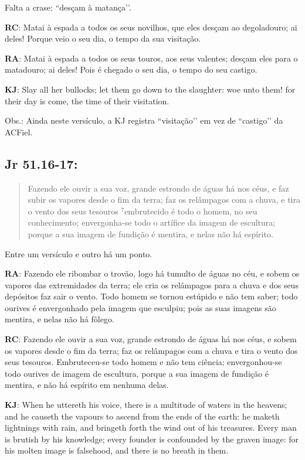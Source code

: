 Falta a crase: ``desçam à matança’’.

\textbf{RC}: Matai à espada a todos os seus novilhos, que eles desçam ao degoladouro; ai deles! Porque veio o seu dia, o tempo da sua visitação.

\textbf{RA}: Matai à espada a todos os seus touros, aos seus valentes; desçam eles para o matadouro; ai deles! Pois é chegado o seu dia, o tempo do seu castigo.

\textbf{KJ}: Slay all her bullocks; let them go down to the slaughter: woe unto them! for their day is come, the time of their visitation.

Obs.: Ainda neste versículo, a KJ registra ``visitação’’ em vez de ``castigo’’ da ACFiel.

\subsection*{Jr 51.16-17:} 
 \begin{quote}
  \small
Fazendo ele ouvir a sua voz, grande estrondo de águas há nos céus, e faz subir os vapores desde o fim da terra; faz os relâmpagos com a chuva, e tira o vento dos seus tesouros\uwave{,} $^{\mathrm{7}}$embrutecido é todo o homem, no seu conhecimento; envergonha-se todo o artífice da imagem de escultura; porque a sua imagem de fundição é mentira, e nelas não há espírito.
\end{quote}

Entre um versículo e outro há um ponto.

\textbf{RA}: Fazendo ele ribombar o trovão, logo há tumulto de águas no céu, e sobem os vapores das extremidades da terra; ele cria os relâmpagos para a chuva e dos seus depósitos faz sair o vento. Todo homem se tornou estúpido e não tem saber; todo ourives é envergonhado pela imagem que esculpiu; pois as suas imagens são mentira, e nelas não há fôlego.

\textbf{RC}: Fazendo ele ouvir a sua voz, grande estrondo de águas há nos céus, e sobem os vapores desde o fim da terra; faz os relâmpagos com a chuva e tira o vento dos seus tesouros. Embruteceu-se todo homem e não tem ciência; envergonhou-se todo ourives de imagem de escultura, porque a sua imagem de fundição é mentira, e não há espírito em nenhuma delas.

\textbf{KJ}: When he uttereth his voice, there is a multitude of waters in the heavens; and he causeth the vapours to ascend from the ends of the earth: he maketh lightnings with rain, and bringeth forth the wind out of his treasures. Every man is brutish by his knowledge; every founder is confounded by the graven image: for his molten image is falsehood, and there is no breath in them.

